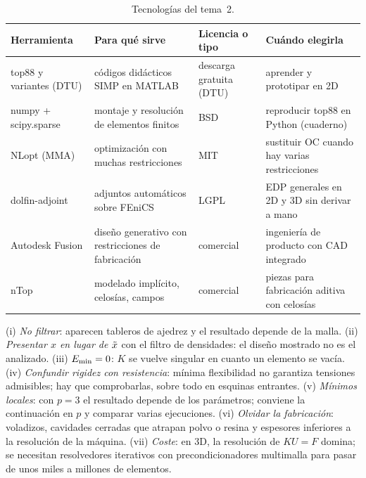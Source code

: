 \begin{table}[h]
\centering\small
\begin{tabularx}{\textwidth}{@{}l>{\raggedright\arraybackslash}X>{\raggedright\arraybackslash}p{2.7cm}>{\raggedright\arraybackslash}X@{}}
\toprule
Herramienta & Para qué sirve & Licencia o tipo & Cuándo elegirla \\
\midrule
top88 y variantes (DTU) & códigos didácticos SIMP en MATLAB & descarga gratuita (DTU) & aprender y prototipar en 2D \\
numpy + scipy.sparse & montaje y resolución de elementos finitos & BSD & reproducir top88 en Python (cuaderno) \\
NLopt (MMA) & optimización con muchas restricciones & MIT & sustituir OC cuando hay varias restricciones \\
dolfin-adjoint & adjuntos automáticos sobre FEniCS & LGPL & EDP generales en 2D y 3D sin derivar a mano \\
Autodesk Fusion & diseño generativo con restricciones de fabricación & comercial & ingeniería de producto con CAD integrado \\
nTop & modelado implícito, celosías, campos & comercial & piezas para fabricación aditiva con celosías \\
\bottomrule
\end{tabularx}
\caption{Tecnologías del tema~2.}
\label{tab:tec2}
\end{table}

\begin{observacion}\label{obs:errores2}
(i) \emph{No filtrar}: aparecen tableros de ajedrez y el resultado depende de la malla. (ii) \emph{Presentar $x$ en lugar de $\tilde{x}$} con el filtro de densidades: el diseño mostrado no es el analizado. (iii) \emph{$E_{\min}=0$}: $K$ se vuelve singular en cuanto un elemento se vacía. (iv) \emph{Confundir rigidez con resistencia}: mínima flexibilidad no garantiza tensiones admisibles; hay que comprobarlas, sobre todo en esquinas entrantes. (v) \emph{Mínimos locales}: con $p=3$ el resultado depende de los parámetros; conviene la continuación en $p$ y comparar varias ejecuciones. (vi) \emph{Olvidar la fabricación}: voladizos, cavidades cerradas que atrapan polvo o resina y espesores inferiores a la resolución de la máquina. (vii) \emph{Coste}: en 3D, la resolución de $KU=F$ domina; se necesitan resolvedores iterativos con precondicionadores multimalla para pasar de unos miles a millones de elementos.
\end{observacion}

